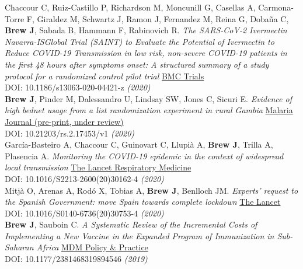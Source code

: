 \documentclass[11pt]{article}
\begin{document}
\noindent Chaccour C, Ruiz-Castillo P, Richardson M, Moncunill G, Casellas A, Carmona-Torre F, Giraldez M, Schwartz J, Ramon J, Fernandez M, Reina G, Dobaña C, \textbf{Brew J}, Sabada B, Hammann F, Rabinovich R. \emph{The SARS-CoV-2 Ivermectin Navarra-ISGlobal Trial (SAINT) to Evaluate the Potential of Ivermectin to Reduce COVID-19 Transmission in low risk, non-severe COVID-19 patients in the first 48 hours after symptoms onset: A structured summary of a study protocol for a randomized control pilot trial} \href{https://trialsjournal.biomedcentral.com/articles/10.1186/s13063-020-04421-z}{BMC Trials} \\ DOI: 10.1186/s13063-020-04421-z \hfill \emph{(2020)} \\


\noindent \textbf{Brew J}, Pinder M, Dalessandro U, Lindsay SW, Jones C, Sicuri E. \emph{Evidence of high bednet usage from a list randomization experiment in rural Gambia} \href{https://www.researchsquare.com/article/rs-8087/v1}{Malaria Journal (pre-print, under review)} \\ DOI: 10.21203/rs.2.17453/v1 \hfill \emph{(2020)} \\

\noindent García-Basteiro A, Chaccour C, Guinovart C, Llupià A, \textbf{Brew J}, Trilla A, Plasencia A. \emph{Monitoring the COVID-19 epidemic in the context of widespread local transmission} \href{https://www.thelancet.com/journals/lanres/article/PIIS2213-2600(20)30162-4/fulltext}{The Lancet Respiratory Medicine} \\ DOI: 10.1016/S2213-2600(20)30162-4 \hfill \emph{(2020)} \\


\noindent Mitjà O, Arenas A, Rodó X, Tobias A, \textbf{Brew J}, Benlloch JM. \emph{Experts' request to the Spanish Government: move Spain towards complete lockdown} \href{https://www.thelancet.com/pb-assets/Lancet/pdfs/S0140673620307534.pdf}{The Lancet} \\ DOI: 10.1016/S0140-6736(20)30753-4 \hfill \emph{(2020)} \\

\noindent \textbf{Brew J}, Sauboin C. \emph{A Systematic Review of the Incremental Costs of Implementing a New Vaccine in the Expanded Program of Immunization in Sub-Saharan Africa} \href{https://doi.org/10.1177/2381468319894546}{MDM Policy & Practice} \\ DOI: 10.1177/2381468319894546 \hfill \emph{(2019)} \\
\end{document}
